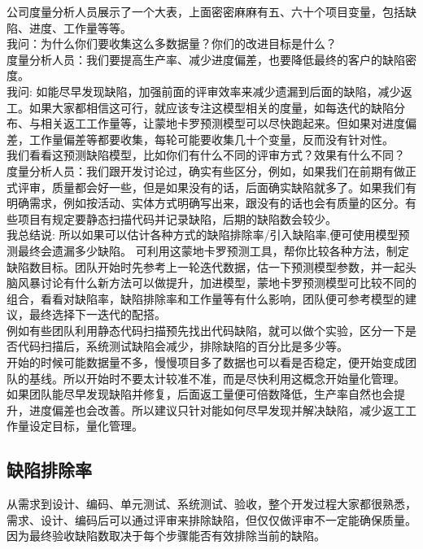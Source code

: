 公司度量分析人员展示了一个大表，上面密密麻麻有五、六十个项目变量，包括缺陷、进度、工作量等等。\\
我问：为什么你们要收集这么多数据量？你们的改进目标是什么？\\
度量分析人员：我们要提高生产率、减少进度偏差，也要降低最终的客户的缺陷密度。\\
我问:
如能尽早发现缺陷，加强前面的评审效率来减少遗漏到后面的缺陷，减少返工。如果大家都相信这可行，就应该专注这模型相关的度量，如每迭代的缺陷分布、与相关返工工作量等，让蒙地卡罗预测模型可以尽快跑起来。但如果对进度偏差，工作量偏差等都要收集，每轮可能要收集几十个变量，反而没有针对性。\\
我们看看这预测缺陷模型，比如你们有什么不同的评审方式？效果有什么不同？\\
度量分析人员：我们跟开发讨论过，确实有些区分，例如，如果我们在前期有做正式评审，质量都会好一些，但是如果没有的话，后面确实缺陷就多了。如果我们有明确需求，例如按活动、实体方式明确写出来，跟没有的话也会有质量的区分。有些项目有规定要静态扫描代码并记录缺陷，后期的缺陷数会较少。\\
我总结说:
所以如果可以估计各种方式的缺陷排除率/引入缺陷率,便可使用模型预测最终会遗漏多少缺陷。
可利用这蒙地卡罗预测工具，帮你比较各种方法，制定缺陷数目标。团队开始时先参考上一轮迭代数据，估一下预测模型参数，并一起头脑风暴讨论有什么新方法可以做提升，加进模型，蒙地卡罗预测模型可比较不同的组合，看看对缺陷率，缺陷排除率和工作量等有什么影响，团队便可参考模型的建议，最终选择下一迭代的配搭。\\
例如有些团队利用静态代码扫描预先找出代码缺陷，就可以做个实验，区分一下是否代码扫描后，系统测试缺陷会减少，排除缺陷的百分比是多少等。\\
开始的时候可能数据量不多，慢慢项目多了数据也可以看是否稳定，便开始变成团队的基线。所以开始时不要太计较准不准，而是尽快利用这概念开始量化管理。\\
如果团队能尽早发现缺陷并修复，后面返工量便可倍数降低，生产率自然也会提升，进度偏差也会改善。所以建议只针对能如何尽早发现并解决缺陷，减少返工工作量设定目标，量化管理。

\hypertarget{ux7f3aux9677ux6392ux9664ux7387}{%
\subsection{缺陷排除率}\label{ux7f3aux9677ux6392ux9664ux7387}}

从需求到设计、编码、单元测试、系统测试、验收，整个开发过程大家都很熟悉，需求、设计、编码后可以通过评审来排除缺陷，但仅仅做评审不一定能确保质量。因为最终验收缺陷数取决于每个步骤能否有效排除当前的缺陷。

